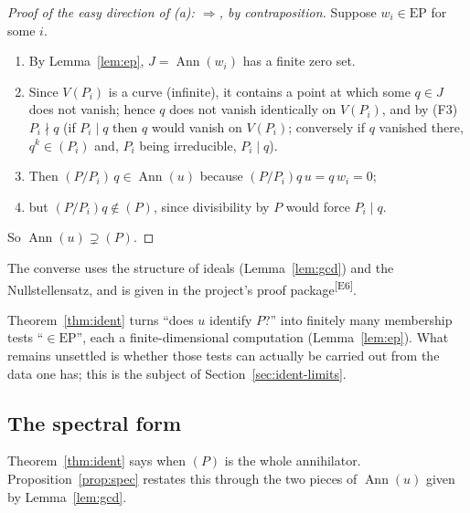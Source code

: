 \documentclass[11pt,a4paper]{article}
\theoremstyle{definition}
\newcommand{\edmark}[1]{\textsuperscript{\textcolor{cB}{\textsf{[#1]}}}}
\newcommand{\Ann}{\operatorname{Ann}}
\newcommand{\EP}{\mathrm{EP}}
\newcommand{\Var}{V}
\begin{document}
\begin{proof}[Proof of the easy direction of (a): $\Rightarrow$, by contraposition]
Suppose $w_i\in\EP$ for some $i$.
\begin{enumerate}[nosep,label=\arabic*.]
\item By Lemma~\ref{lem:ep}, $J=\Ann(w_i)$ has a finite zero set.
\item Since $\Var(P_i)$ is a curve (infinite), it contains a point at which some $q\in J$ does not vanish; hence $q$ does not vanish identically on $\Var(P_i)$, and by (F3) $P_i\nmid q$ (if $P_i\mid q$ then $q$ would vanish on $\Var(P_i)$; conversely if $q$ vanished there, $q^k\in(P_i)$ and, $P_i$ being irreducible, $P_i\mid q$).
\item Then $(P/P_i)\,q\in\Ann(u)$ because $(P/P_i)q\,u=q\,w_i=0$;
\item but $(P/P_i)q\notin(P)$, since divisibility by $P$ would force $P_i\mid q$.
\end{enumerate}
So $\Ann(u)\supsetneq(P)$. \end{proof}
The converse uses the structure of ideals (Lemma~\ref{lem:gcd}) and the Nullstellensatz, and is given in the project's proof package\edmark{E6}.



\begin{takeaway}
Theorem~\ref{thm:ident} turns ``does $u$ identify $P$?'' into finitely many membership tests ``$\in\EP$'', each a finite-dimensional computation (Lemma~\ref{lem:ep}). What remains unsettled is whether those tests can actually be carried out from the data one has; this is the subject of Section~\ref{sec:ident-limits}.
\end{takeaway}



\subsection{The spectral form}\label{sec:spectral}
Theorem~\ref{thm:ident} says when $(P)$ is the whole annihilator. Proposition~\ref{prop:spec} restates this through the two pieces of $\Ann(u)$ given by Lemma~\ref{lem:gcd}.
\end{document}
